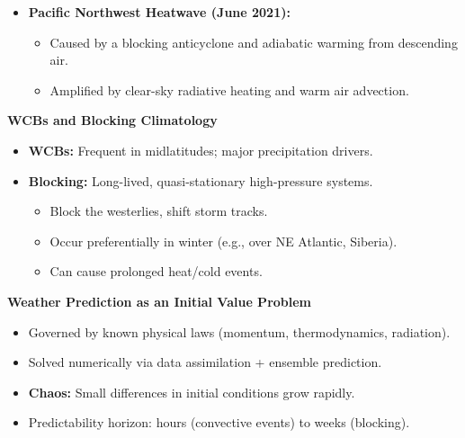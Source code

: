 \documentclass[fontsize=8pt, a4paper, landscape, fleqn]{scrartcl}
\renewcommand{\subsection}[1]{%
    \noindent\colorbox{subsectioncolor}{%
        \parbox{\dimexpr\columnwidth-2\fboxsep}{\color{white}\textbf{#1}}}%
    \vspace{0.5mm}%
}
\begin{document}
\begin{multicols*}{3}[\raggedcolumns]
\begin{itemize}
    \item \textbf{Pacific Northwest Heatwave (June 2021):}
    \begin{itemize}
        \item Caused by a blocking anticyclone and adiabatic warming from descending air.
        \item Amplified by clear-sky radiative heating and warm air advection.
    \end{itemize}
\end{itemize}

\subsection{WCBs and Blocking Climatology}
\begin{itemize}
    \item \textbf{WCBs:} Frequent in midlatitudes; major precipitation drivers.
    \item \textbf{Blocking:} Long-lived, quasi-stationary high-pressure systems.
    \begin{itemize}
        \item Block the westerlies, shift storm tracks.
        \item Occur preferentially in winter (e.g., over NE Atlantic, Siberia).
        \item Can cause prolonged heat/cold events.
    \end{itemize}
\end{itemize}

\subsection{Weather Prediction as an Initial Value Problem}
\begin{itemize}
    \item Governed by known physical laws (momentum, thermodynamics, radiation).
    \item Solved numerically via data assimilation + ensemble prediction.
    \item \textbf{Chaos:} Small differences in initial conditions grow rapidly.
    \item Predictability horizon: hours (convective events) to weeks (blocking).
\end{itemize}


\end{multicols*}
\end{document}
